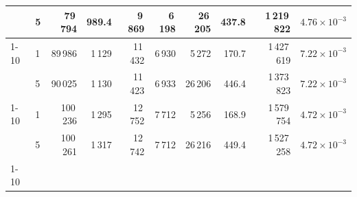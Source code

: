 \begin{tabular}{llrrrrrrrr}
 & 5 & 79\,794 & 989.4 & 9\,869 & 6\,198 & 26\,205 & 437.8 & 1\,219\,822 & $4.76\!\times\!10^{-3}$ \\
\cline{1-10}
\multirow[t]{2}{*}{450} & 1 & 89\,986 & 1\,129 & 11\,432 & 6\,930 & 5\,272 & 170.7 & 1\,427\,619 & $7.22\!\times\!10^{-3}$ \\
 & 5 & 90\,025 & 1\,130 & 11\,423 & 6\,933 & 26\,206 & 446.4 & 1\,373\,823 & $7.22\!\times\!10^{-3}$ \\
\cline{1-10}
\multirow[t]{2}{*}{500} & 1 & 100\,236 & 1\,295 & 12\,752 & 7\,712 & 5\,256 & 168.9 & 1\,579\,754 & $4.72\!\times\!10^{-3}$ \\
 & 5 & 100\,261 & 1\,317 & 12\,742 & 7\,712 & 26\,216 & 449.4 & 1\,527\,258 & $4.72\!\times\!10^{-3}$ \\
\cline{1-10}
\bottomrule
\end{tabular}
